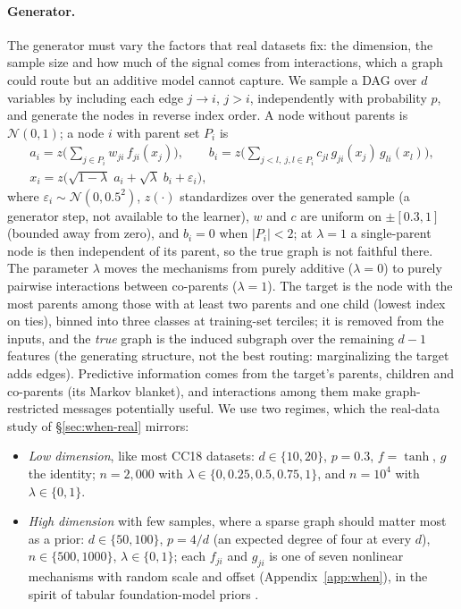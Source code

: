 \documentclass[anon,12pt]{clear2027} %
\begin{document}
\paragraph{Generator.}
The generator must vary the factors that real datasets fix: the dimension, the sample size and how much of the signal comes from interactions, which a graph could route but an additive model cannot capture. We sample a DAG over $d$ variables by including each edge $j\to i$, $j>i$, independently with probability $p$, and generate the nodes in reverse index order. A node without parents is $\mathcal N(0,1)$; a node $i$ with parent set $P_i$ is
\begin{equation}
\begin{gathered}
a_i = z\Big(\textstyle\sum_{j\in P_i} w_{ji}\, f_{ji}(x_j)\Big),\qquad
b_i = z\Big(\textstyle\sum_{j<l,\ j,l\in P_i} c_{jl}\, g_{ji}(x_j)\, g_{li}(x_l)\Big),\\
x_i = z\Big(\sqrt{1-\lambda}\;a_i + \sqrt{\lambda}\;b_i + \varepsilon_i\Big),
\end{gathered}
\label{eq:scm}
\end{equation}
where $\varepsilon_i\sim\mathcal N(0,0.5^2)$, $z(\cdot)$ standardizes over the generated sample (a generator step, not available to the learner), $w$ and $c$ are uniform on $\pm[0.3,1]$ (bounded away from zero), and $b_i=0$ when $|P_i|<2$; at $\lambda=1$ a single-parent node is then independent of its parent, so the true graph is not faithful there. The parameter $\lambda$ moves the mechanisms from purely additive ($\lambda=0$) to purely pairwise interactions between co-parents ($\lambda=1$). The target is the node with the most parents among those with at least two parents and one child (lowest index on ties), binned into three classes at training-set terciles; it is removed from the inputs, and the \emph{true} graph is the induced subgraph over the remaining $d-1$ features (the generating structure, not the best routing: marginalizing the target adds edges). Predictive information comes from the target's parents, children and co-parents (its Markov blanket), and interactions among them make graph-restricted messages potentially useful. We use two regimes, which the real-data study of \S\ref{sec:when-real} mirrors:
\begin{itemize}
\item \emph{Low dimension}, like most CC18 datasets: $d\in\{10,20\}$, $p=0.3$, $f=\tanh$, $g$ the identity; $n=2{,}000$ with $\lambda\in\{0,0.25,0.5,0.75,1\}$, and $n=10^4$ with $\lambda\in\{0,1\}$.
\item \emph{High dimension} with few samples, where a sparse graph should matter most as a prior: $d\in\{50,100\}$, $p=4/d$ (an expected degree of four at every $d$), $n\in\{500,1000\}$, $\lambda\in\{0,1\}$; each $f_{ji}$ and $g_{ji}$ is one of seven nonlinear mechanisms with random scale and offset (Appendix~\ref{app:when}), in the spirit of tabular foundation-model priors \citep{hollmann2023tabpfn}.
\end{itemize}
\end{document}
